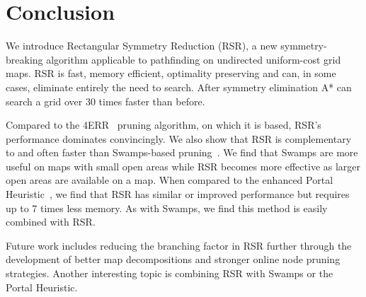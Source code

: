 \section{Conclusion}
We introduce Rectangular Symmetry Reduction (RSR), a new symmetry-breaking algorithm
applicable to pathfinding on undirected uniform-cost grid maps. RSR is fast,
memory efficient, optimality preserving and can, in some cases, eliminate
entirely the need to search.  After symmetry elimination A* can
search a grid over 30 times faster than before.
\par
Compared to the 4ERR~\cite{harabor10} pruning algorithm, on which it is based,
RSR's performance dominates convincingly.
We also show that RSR is complementary to and often faster than Swamps-based
pruning~\cite{pochter10}.
We find that Swamps are more useful on maps with small open areas
while RSR becomes more effective as larger open areas are available on a map. 
When compared to the enhanced Portal Heuristic~\cite{goldenberg10}, we find that 
RSR has similar or improved performance but requires up to 7 times less memory.
As with Swamps, we find this method is easily combined with RSR.
\par
Future work includes reducing the branching factor in RSR further through the 
development of better map decompositions and stronger online node pruning
strategies.
Another interesting topic is combining RSR with Swamps or the Portal Heuristic.
